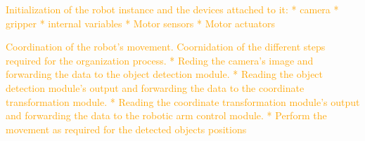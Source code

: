 \textcolor{orange}{
Initialization of the robot instance and the devices attached to it: 
* camera
* gripper
* internal variables
* Motor sensors
* Motor actuators
}

\textcolor{orange}{
Coordination of the robot's movement.
Coornidation of the different steps required for the organization process.
* Reding the camera's image and forwarding the data to the object detection module.
* Reading the object detection module's output and forwarding the data to the coordinate transformation module.
* Reading the coordinate transformation module's output and forwarding the data to the robotic arm control module.
* Perform the movement as required for the detected objects positions
} %

